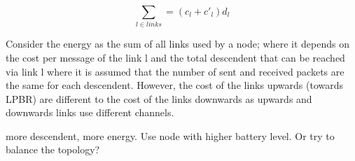 \begin{equation}
\sum_{l \in links} = (c_{l} + c'_{l})d_{l}
\end{equation}

Consider the energy as the sum of all links used by a node; where it depends on the cost per message of the link l and the total descendent that can be reached via link l where it is assumed that the number of sent and received packets are the same for each descendent. However, the cost of the links upwards (towards LPBR) are different to the cost of the links downwards as upwards and downwards links use different channels. 

more descendent, more energy. Use node with higher battery level.
Or try to balance the topology?






